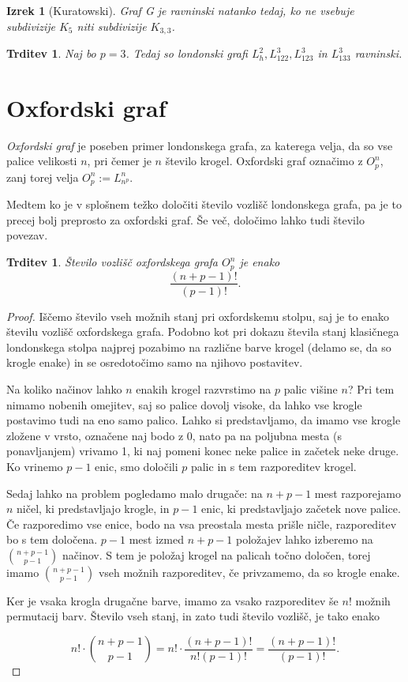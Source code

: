 \documentclass[11pt,a4paper]{article}
\theoremstyle{definition} %
\theoremstyle{plain} %
\newtheorem{izrek}[definicija]{Izrek}
\newtheorem{trditev}[definicija]{Trditev}
\begin{document}
\begin{izrek}[Kuratowski]
    Graf G je ravninski natanko tedaj, ko ne vsebuje subdivizije $K_5$ niti subdivizije $K_{3,3}$.
\end{izrek}

\begin{trditev}
    Naj bo $p=3$. Tedaj so londonski grafi $L_h^2, L_{122}^3,L_{123}^3$ in $ L_{133}^3$ ravninski.
\end{trditev}


\section{Oxfordski graf}

\emph{Oxfordski graf} je poseben primer londonskega grafa, za katerega velja, da so vse palice velikosti $n$, pri čemer je $n$ število krogel. Oxfordski graf označimo z $O^n_p$, zanj torej velja $O^n_p := L^n_{n^p}$.

Medtem ko je v splošnem težko določiti število vozlišč londonskega grafa, pa je to precej bolj preprosto za oxfordski graf. Še več, določimo lahko tudi število povezav.

\begin{trditev}
	Število vozlišč oxfordskega grafa $O^n_p$ je enako \[\frac{(n+p-1)!}{(p-1)!}.\]
\end{trditev}

\begin{proof}
	Iščemo število vseh možnih stanj pri oxfordskemu stolpu, saj je to enako številu vozlišč oxfordskega grafa.
	Podobno kot pri dokazu števila stanj klasičnega londonskega stolpa najprej pozabimo na različne barve krogel (delamo se, da so krogle enake) in se osredotočimo samo na njihovo postavitev. 
	
	Na koliko načinov lahko $n$ enakih krogel razvrstimo na $p$ palic višine $n$? Pri tem nimamo nobenih omejitev, saj so palice dovolj visoke, da lahko vse krogle postavimo tudi na eno samo palico. Lahko si predstavljamo, da imamo vse krogle zložene v vrsto, označene naj bodo z 0, nato pa na poljubna mesta (s ponavljanjem) vrivamo 1, ki naj pomeni konec neke palice in začetek neke druge. Ko vrinemo $p-1$ enic, smo določili $p$ palic in s tem razporeditev krogel. 
	
	Sedaj lahko na problem pogledamo malo drugače: na $n+p-1$ mest razporejamo $n$ ničel, ki predstavljajo krogle, in $p-1$ enic, ki predstavljajo začetek nove palice. Če razporedimo vse enice, bodo na vsa preostala mesta prišle ničle, razporeditev bo s tem določena. $p-1$ mest izmed $n+p-1$ položajev lahko izberemo na ${n+p-1 \choose p-1}$ načinov. S tem je položaj krogel na palicah točno določen, torej imamo ${n+p-1 \choose p-1}$ vseh možnih razporeditev, če privzamemo, da so krogle enake. 
	
	Ker je vsaka krogla drugačne barve, imamo za vsako razporeditev še $n!$ možnih permutacij barv. Število vseh stanj, in zato tudi število vozlišč, je tako enako
	
	\[ n! \cdot {n+p-1 \choose p-1} = n! \cdot \frac{(n+p-1)!}{n!(p-1)!} = \frac{(n+p-1)!}{(p-1)!}. \] \qedhere
\end{proof}
\end{document}

